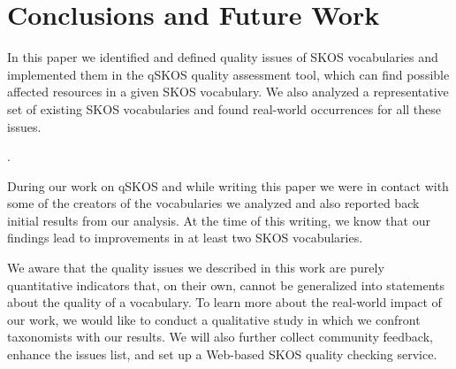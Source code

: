\section{Conclusions and Future Work}\label{sec:conclusions}

In this paper we identified and defined quality issues of SKOS vocabularies and implemented them in the qSKOS quality assessment tool, which can find possible affected resources in a given SKOS vocabulary. We also analyzed a representative set of existing SKOS vocabularies and found real-world occurrences for all these issues. 

.

During our work on qSKOS and while writing this paper we were in contact with some of the creators of the vocabularies we analyzed and also reported back initial results from our analysis. At the time of this writing, we know that our findings lead to improvements in at least two SKOS vocabularies.

We aware that the quality issues we described in this work are purely quantitative indicators that, on their own, cannot be generalized into statements about the quality of a vocabulary. To learn more about the real-world impact of our work, we would like to conduct a qualitative study in which we confront taxonomists with our results. We will also further collect community feedback, enhance the issues list, and set up a Web-based SKOS quality checking service.



